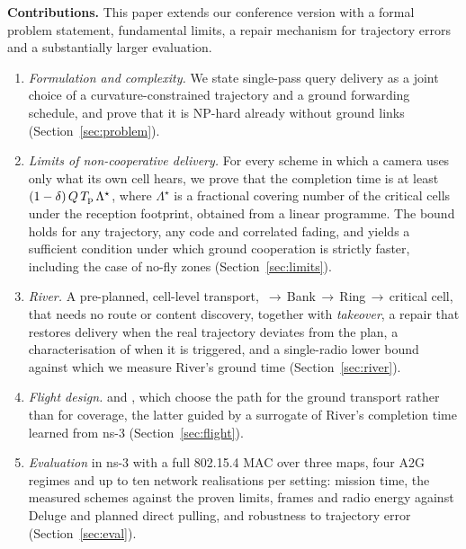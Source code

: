 \textbf{Contributions.} This paper extends our conference version  with a formal problem
statement, fundamental limits, a repair mechanism for trajectory errors and a substantially larger evaluation.
\begin{enumerate}
\item \emph{Formulation and complexity.} We state single-pass query delivery as a joint choice of a curvature-constrained
trajectory and a ground forwarding schedule, and prove that it is NP-hard already without ground links
(Section~\ref{sec:problem}).
\item \emph{Limits of non-cooperative delivery.} For every scheme in which a camera uses only what its own cell hears,
we prove that the completion time is at least $(1-\delta)\,Q\,T_{\mathrm p}\,\Lambda^\star$, where $\Lambda^\star$ is a fractional
covering number of the critical cells under the reception footprint, obtained from a linear programme. The bound holds
for any trajectory, any code and correlated fading, and yields a sufficient condition under which ground cooperation
is strictly faster, including the case of no-fly zones (Section~\ref{sec:limits}).
\item \emph{River.} A pre-planned, cell-level transport, \spine{}\,$\to$\,Bank\,$\to$\,Ring\,$\to$\,critical cell, that
needs no route or content discovery, together with \emph{takeover}, a repair that restores delivery when the real
trajectory deviates from the plan, a characterisation of when it is triggered, and a single-radio lower bound against
which we measure River's ground time (Section~\ref{sec:river}).
\item \emph{Flight design.} \chord{} and \lmtour{}, which choose the path for the ground transport rather than for
coverage, the latter guided by a surrogate of River's completion time learned from ns-3 (Section~\ref{sec:flight}).
\item \emph{Evaluation} in ns-3 with a full 802.15.4 MAC over three maps, four A2G regimes and up to ten network
realisations per setting: mission time, the measured schemes against the proven limits, frames and radio energy
against Deluge and planned direct pulling, and robustness to trajectory error (Section~\ref{sec:eval}).
\end{enumerate}

